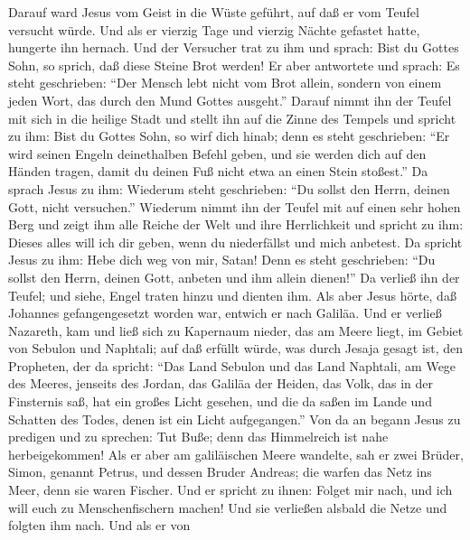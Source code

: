  Darauf ward Jesus vom Geist in die Wüste geführt, auf daß
er vom Teufel versucht würde.  Und als er vierzig Tage und
vierzig Nächte gefastet hatte, hungerte ihn hernach.  Und
der Versucher trat zu ihm und sprach: Bist du Gottes Sohn, so sprich,
daß diese Steine Brot werden!  Er aber antwortete und
sprach: Es steht geschrieben: ``Der Mensch lebt nicht vom Brot allein,
sondern von einem jeden Wort, das durch den Mund Gottes ausgeht.''
 Darauf nimmt ihn der Teufel mit sich in die heilige Stadt
und stellt ihn auf die Zinne des Tempels  und spricht zu
ihm: Bist du Gottes Sohn, so wirf dich hinab; denn es steht geschrieben:
``Er wird seinen Engeln deinethalben Befehl geben, und sie werden dich
auf den Händen tragen, damit du deinen Fuß nicht etwa an einen Stein
stoßest.''  Da sprach Jesus zu ihm: Wiederum steht
geschrieben: ``Du sollst den Herrn, deinen Gott, nicht versuchen.''
 Wiederum nimmt ihn der Teufel mit auf einen sehr hohen
Berg und zeigt ihm alle Reiche der Welt und ihre Herrlichkeit
 und spricht zu ihm: Dieses alles will ich dir geben, wenn
du niederfällst und mich anbetest.  Da spricht Jesus zu
ihm: Hebe dich weg von mir, Satan! Denn es steht geschrieben: ``Du
sollst den Herrn, deinen Gott, anbeten und ihm allein dienen!''
 Da verließ ihn der Teufel; und siehe, Engel traten hinzu
und dienten ihm.  Als aber Jesus hörte, daß Johannes
gefangengesetzt worden war, entwich er nach Galiläa.  Und
er verließ Nazareth, kam und ließ sich zu Kapernaum nieder, das am Meere
liegt, im Gebiet von Sebulon und Naphtali;  auf daß
erfüllt würde, was durch Jesaja gesagt ist, den Propheten, der da
spricht:  ``Das Land Sebulon und das Land Naphtali, am
Wege des Meeres, jenseits des Jordan, das Galiläa der Heiden,
 das Volk, das in der Finsternis saß, hat ein großes
Licht gesehen, und die da saßen im Lande und Schatten des Todes, denen
ist ein Licht aufgegangen.''  Von da an begann Jesus zu
predigen und zu sprechen: Tut Buße; denn das Himmelreich ist nahe
herbeigekommen!  Als er aber am galiläischen Meere
wandelte, sah er zwei Brüder, Simon, genannt Petrus, und dessen Bruder
Andreas; die warfen das Netz ins Meer, denn sie waren Fischer.
 Und er spricht zu ihnen: Folget mir nach, und ich will
euch zu Menschenfischern machen!  Und sie verließen
alsbald die Netze und folgten ihm nach.  Und als er von
